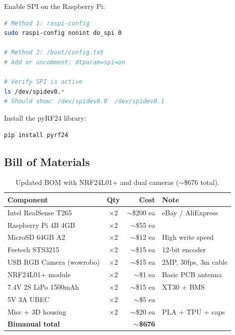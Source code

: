 \documentclass[11pt,a4paper]{article}
\begin{document}
Enable SPI on the Raspberry Pi:

\begin{lstlisting}[language=bash]
# Method 1: raspi-config
sudo raspi-config nonint do_spi 0

# Method 2: /boot/config.txt
# Add or uncomment: dtparam=spi=on

# Verify SPI is active
ls /dev/spidev0.*
# Should show: /dev/spidev0.0  /dev/spidev0.1
\end{lstlisting}

Install the pyRF24 library:

\begin{lstlisting}[language=bash]
pip install pyrf24
\end{lstlisting}


\subsection{Bill of Materials}

\begin{table}[htbp]
\centering
\caption{Updated BOM with NRF24L01+ and dual cameras (${\sim}$\$676 total).}
\begin{tabular}{l c r l}
\toprule
\textbf{Component} & \textbf{Qty} & \textbf{Cost} & \textbf{Note} \\
\midrule
Intel RealSense T265 & $\times$2 & ${\sim}$\$200 ea & eBay / AliExpress \\
Raspberry Pi 4B 4GB & $\times$2 & ${\sim}$\$55 ea & \\
MicroSD 64GB A2 & $\times$2 & ${\sim}$\$12 ea & High write speed \\
Feetech STS3215 & $\times$2 & ${\sim}$\$15 ea & 12-bit encoder \\
USB RGB Camera (wowrobo) & $\times$2 & ${\sim}$\$15 ea & 2MP, 30fps, 3m cable \\
NRF24L01+ module & $\times$2 & ${\sim}$\$1 ea & Basic PCB antenna \\
7.4V 2S LiPo 1500mAh & $\times$2 & ${\sim}$\$15 ea & XT30 + BMS \\
5V 3A UBEC & $\times$2 & ${\sim}$\$5 ea & \\
Misc + 3D housing & $\times$2 & ${\sim}$\$20 ea & PLA + TPU + caps \\
\midrule
\textbf{Bimanual total} & & \textbf{${\sim}$\$676} & \\
\bottomrule
\end{tabular}
\label{tab:bom}
\end{table}
\end{document}
